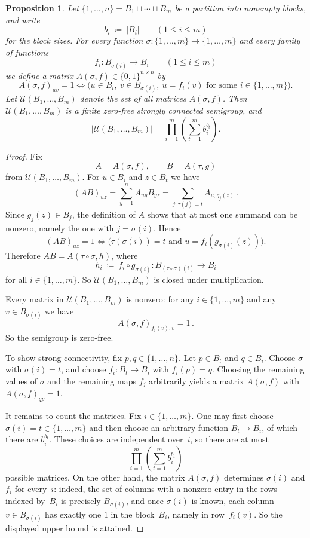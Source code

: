 \documentclass{lmcs}
\newtheorem{proposition}[thm]{Proposition}
\theoremstyle{definition}
\newcommand{\U}{\mathcal{U}}
\begin{document}
\begin{proposition}\label{prop:lower-zero-free-strong}
Let $\{1,\ldots,n\} = B_1 \sqcup \cdots \sqcup B_m$ be a partition into nonempty blocks, and write
\[
  b_i \ \coloneqq \ |B_i| \qquad (1 \le i \le m)
\]
for the block sizes. For every function $\sigma : \{1,\ldots,m\} \to \{1,\ldots,m\}$ and every family of functions
\[
  f_i : B_{\sigma(i)} \to B_i \qquad (1 \le i \le m)
\]
we define a matrix $A(\sigma,f) \in \{0,1\}^{n \times n}$ by
\[
  A(\sigma,f)_{u v} = 1
  \iff
  \bigl(u \in B_i,\ v \in B_{\sigma(i)},\ u = f_i(v) \text{ for some } i \in \{1,\ldots,m\}\bigr).
\]
Let $\U(B_1,\ldots,B_m)$ denote the set of all matrices $A(\sigma,f)$.
Then $\U(B_1,\ldots,B_m)$ is a finite zero-free strongly connected semigroup, and
\[
  |\U(B_1,\ldots,B_m)|
  =
  \prod_{i=1}^m \left( \sum_{t=1}^m b_i^{b_t} \right).
\]
\end{proposition}
\begin{proof}
Fix
\[
  A = A(\sigma,f), \qquad B = A(\tau,g)
\]
from $\U(B_1,\ldots,B_m)$. For $u \in B_i$ and $z \in B_t$ we have
\[
  (A B)_{u z}
  =
  \sum_{y=1}^n A_{u y} B_{y z}
  =
  \sum_{j : \tau(j)=t} A_{u, g_j(z)}\,.
\]
Since $g_j(z) \in B_j$, the definition of $A$ shows that at most one summand can be nonzero, namely the one with $j = \sigma(i)$. Hence
\[
  (A B)_{u z} = 1
  \iff
  \bigl(\tau(\sigma(i)) = t \text{ and } u = f_i(g_{\sigma(i)}(z))\bigr).
\]
Therefore $A B = A(\tau \circ \sigma,h)$, where
\[
  h_i \ \coloneqq \ f_i \circ g_{\sigma(i)} : B_{(\tau \circ \sigma)(i)} \to B_i
\]
for all $i \in \{1,\ldots,m\}$. So $\U(B_1,\ldots,B_m)$ is closed under multiplication.

Every matrix in $\U(B_1,\ldots,B_m)$ is nonzero: for any $i \in \{1,\ldots,m\}$ and any $v \in B_{\sigma(i)}$ we have
\[
  A(\sigma,f)_{f_i(v),v} = 1\,.
\]
So the semigroup is zero-free.

To show strong connectivity, fix $p,q \in \{1,\ldots,n\}$. Let $p \in B_t$ and $q \in B_i$. Choose $\sigma$ with $\sigma(i)=t$, and choose $f_i : B_t \to B_i$ with $f_i(p)=q$. Choosing the remaining values of $\sigma$ and the remaining maps $f_j$ arbitrarily yields a matrix $A(\sigma,f)$ with $A(\sigma,f)_{q p}=1$.

It remains to count the matrices. Fix $i \in \{1,\ldots,m\}$. One may first choose $\sigma(i)=t \in \{1,\ldots,m\}$ and then choose an arbitrary function $B_t \to B_i$, of which there are $b_i^{b_t}$. These choices are independent over~$i$, so there are at most
\[
  \prod_{i=1}^m \left( \sum_{t=1}^m b_i^{b_t} \right)
\]
possible matrices.
On the other hand, the matrix $A(\sigma,f)$ determines $\sigma(i)$ and $f_i$ for every~$i$: indeed, the set of columns with a nonzero entry in the rows indexed by~$B_i$ is precisely $B_{\sigma(i)}$, and once $\sigma(i)$ is known, each column $v \in B_{\sigma(i)}$ has exactly one $1$ in the block~$B_i$, namely in row~$f_i(v)$. So the displayed upper bound is attained.
\end{proof}
\end{document}
